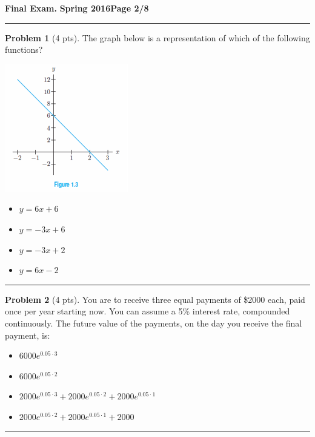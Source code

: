 \documentclass[12pt]{article}
\makeatletter
\theoremstyle{definition}
\newtheorem{problem}{Problem}
\newcommand*{\radiobutton}{%
  \@ifstar{\@radiobutton0}{\@radiobutton1}%
}
\newcommand*{\@radiobutton}[1]{%
  \begin{tikzpicture}
    \pgfmathsetlengthmacro\radius{height("X")/2}
    \draw[radius=\radius] circle;
    \ifcase#1 \fill[radius=.6*\radius] circle;\fi
  \end{tikzpicture}%
}
\makeatother
\begin{document}
\hfill{\large\bf Final Exam.}\hfill{\large\bf
  Spring 2016}\hfill{\large\bf Page 2/8}\hrule

\bigskip

\begin{problem}[4 pts]
The graph below is a representation of which of the following functions?
\begin{multicols}{2}
\begin{center}
\includegraphics{1graph2.png}
\end{center}
\begin{itemize}
\item[\radiobutton] $y=6x+6$
\item[\radiobutton] $y=-3x+6$
\item[\radiobutton] $y=-3x+2$
\item[\radiobutton] $y=6x-2$
\end{itemize}
\end{multicols}
\end{problem}

\hrule
\begin{problem}[4 pts]
You are to receive three equal payments of \$2000 each, paid once per year starting now. You can assume a 5\% interest rate, compounded continuously. The future value of the payments, on the day you receive the final payment, is:
\begin{itemize}
\item[\radiobutton] $6000 e^{0.05 \cdot 3}$
\item[\radiobutton] $6000 e^{0.05 \cdot 2}$
\item[\radiobutton] $2000 e^{0.05 \cdot 3} + 2000 e^{0.05 \cdot 2} + 2000 e^{0.05 \cdot 1}$
\item[\radiobutton] $2000 e^{0.05 \cdot 2} + 2000 e^{0.05 \cdot 1} + 2000$
\end{itemize}
\end{problem}
\hrule
\end{document}
